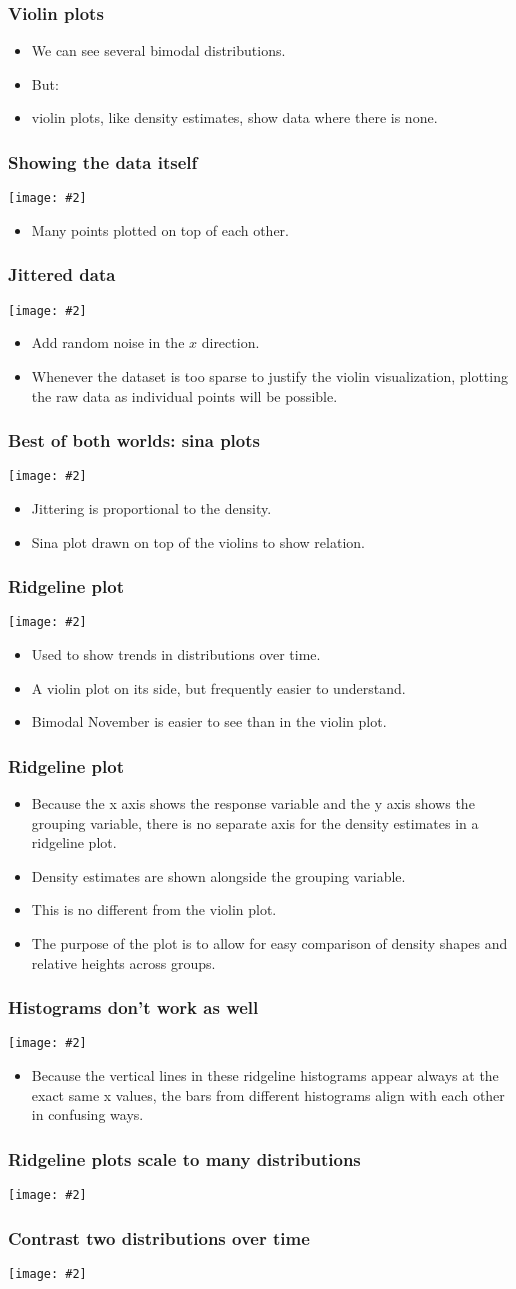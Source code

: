 \documentclass{beamer}
\newcommand{\bi}{\begin{itemize}}
\newcommand{\li}{\item}
\newcommand{\ei}{\end{itemize}}
\newcommand{\fig}[2]{\centerline{\texttt{[image: \#2]}}}
\newcommand{\bfr}[1]{\begin{frame}[fragile]\frametitle{{ #1 }}}
\begin{document}
\bfr{Violin plots}
\bi
\li We can see several bimodal distributions.
\li But:
\li violin plots, like density estimates, show data where there is none.
\ei
\end{frame}

\bfr{Showing the data itself}
\fig{.8}{lincoln-temp-all-points-1.png}
\bi
\li Many points plotted on top of each other.
\ei
\end{frame}

\bfr{Jittered data}
\fig{.8}{lincoln-temp-jittered-1.png}
\bi
\li Add random noise in the $x$ direction.
\li Whenever the dataset is too sparse to justify the violin visualization, plotting the raw data as individual points will be possible.
\ei
\end{frame}

\bfr{Best of both worlds: sina plots}
\fig{.8}{lincoln-temp-sina-1.png}
\bi
\li Jittering is proportional to the density.
\li Sina plot drawn on top of the violins to show relation.
\ei
\end{frame}

\bfr{Ridgeline plot}
\fig{.8}{temp-ridgeline-1.png}
\bi
\li Used to show trends in distributions over time.
\li A violin plot on its side, but frequently easier to understand.
\li Bimodal November is easier to see than in the violin plot.
\ei
\end{frame}

\bfr{Ridgeline plot}
\bi
\li Because the x axis shows the response variable and the y axis shows the grouping variable, there is no separate axis for the density estimates in a ridgeline plot. 
\li Density estimates are shown alongside the grouping variable.
\li This is no different from the violin plot.
\li The purpose of the plot is  to allow for easy comparison of density shapes and relative heights across groups.

\ei
\end{frame}

\bfr{Histograms don't work as well}
\fig{.8}{temp-binline-1.png}
\bi
\li Because the vertical lines in these ridgeline histograms appear always at the exact same x values, the bars from different histograms align with each other in confusing ways. 
\ei
\end{frame}

\bfr{Ridgeline plots scale to many distributions}
\fig{.7}{movies-ridgeline-1.png}
\end{frame}

\bfr{Contrast two distributions over time}
\fig{1}{dw-nominate-ridgeline-1.png}
\end{frame}
\end{document}
